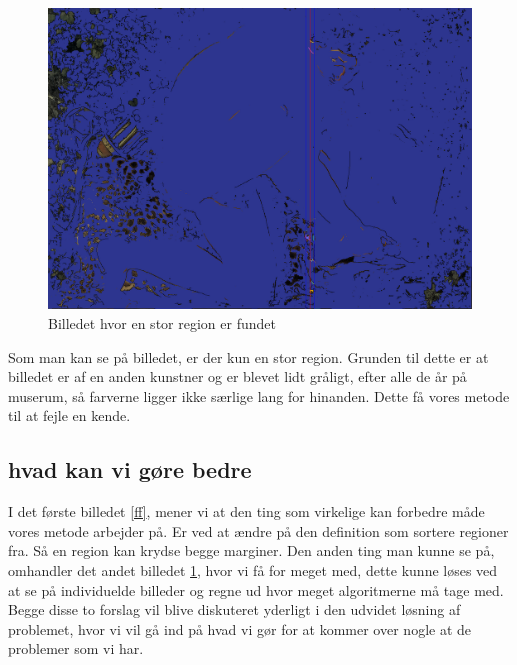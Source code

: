 \begin{figure}[h!!]
	\begin{center}
		\includegraphics[scale=0.20,angle=0]{afsnit/afprovning/billeder/nicofloodfillbilledet.png}
	\end{center}
	\caption[]{Billedet hvor en stor region er fundet}
	\label{nicofill}
\end{figure}

Som man kan se på billedet, er der kun en stor region. Grunden til dette
er at billedet er af en anden kunstner og er blevet lidt gråligt, efter
alle de år på muserum, så farverne ligger ikke særlige lang for
hinanden. Dette få vores metode til at fejle en kende.

\subsection{hvad kan vi gøre bedre}
I det første billedet \ref{ff}, mener vi at den ting som virkelige kan
forbedre måde vores metode arbejder på. Er ved at ændre på den
definition som sortere regioner fra. Så en region kan krydse begge
marginer. Den anden ting man kunne se på, omhandler det andet billedet
\ref{nicofill}, hvor vi få for meget med, dette kunne løses ved at se på
individuelde billeder og regne ud hvor meget algoritmerne må tage med.
Begge disse to forslag vil blive diskuteret yderligt i den udvidet
løsning af problemet, hvor vi vil gå ind på hvad vi gør for at kommer
over nogle at de problemer som vi har.
